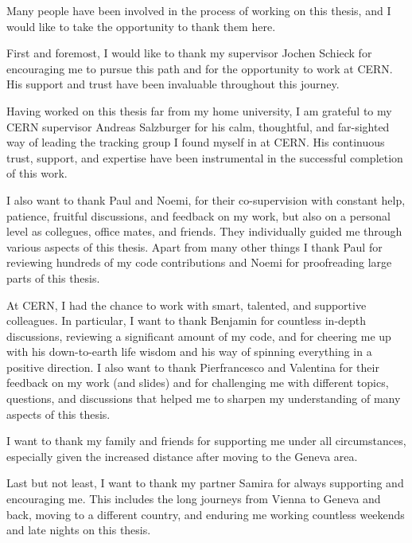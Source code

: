 Many people have been involved in the process of working on this thesis, and I would like to take the opportunity to thank them here.

First and foremost, I would like to thank my supervisor Jochen Schieck for encouraging me to pursue this path and for the opportunity to work at CERN. His support and trust have been invaluable throughout this journey.

Having worked on this thesis far from my home university, I am grateful to my CERN supervisor Andreas Salzburger for his calm, thoughtful, and far-sighted way of leading the tracking group I found myself in at CERN. His continuous trust, support, and expertise have been instrumental in the successful completion of this work.

I also want to thank Paul and Noemi, for their co-supervision with constant help, patience, fruitful discussions, and feedback on my work, but also on a personal level as collegues, office mates, and friends. They individually guided me through various aspects of this thesis. Apart from many other things I thank Paul for reviewing hundreds of my code contributions and Noemi for proofreading large parts of this thesis.

At CERN, I had the chance to work with smart, talented, and supportive colleagues. In particular, I want to thank Benjamin for countless in-depth discussions, reviewing a significant amount of my code, and for cheering me up with his down-to-earth life wisdom and his way of spinning everything in a positive direction. I also want to thank Pierfrancesco and Valentina for their feedback on my work (and slides) and for challenging me with different topics, questions, and discussions that helped me to sharpen my understanding of many aspects of this thesis.


I want to thank my family and friends for supporting me under all circumstances, especially given the increased distance after moving to the Geneva area.

Last but not least, I want to thank my partner Samira for always supporting and encouraging me. This includes the long journeys from Vienna to Geneva and back, moving to a different country, and enduring me working countless weekends and late nights on this thesis.
